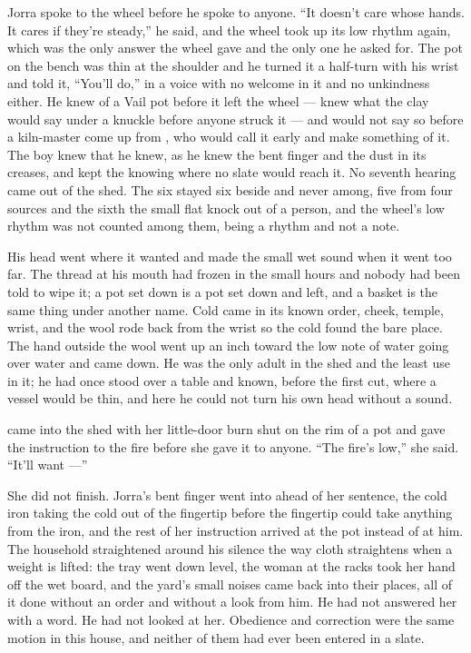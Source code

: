 Jorra spoke to the wheel before he spoke to anyone. “It doesn't care whose hands. It cares if they're steady,” he said, and the wheel took up its low rhythm again, which was the only answer the wheel gave and the only one he asked for. The pot on the bench was thin at the shoulder and he turned it a half-turn with his wrist and told it, “You'll do,” in a voice with no welcome in it and no unkindness either. He knew  of a Vail pot before it left the wheel --- knew what the clay would say under a knuckle before anyone struck it --- and would not say so before a kiln-master come up from , who would call it early and make something of it. The boy knew that he knew, as he knew the bent finger and the dust in its creases, and kept the knowing where no slate would reach it. No seventh hearing came out of the shed. The six stayed six beside and never among, five from four sources and the sixth the small flat knock out of a person, and the wheel's low rhythm was not counted among them, being a rhythm and not a note.

His head went where it wanted and made the small wet sound when it went too far. The thread at his mouth had frozen in the small hours and nobody had been told to wipe it; a pot set down is a pot set down and left, and a basket is the same thing under another name. Cold came in its known order, cheek, temple, wrist, and the wool rode back from the wrist so the cold found the bare place. The hand outside the wool went up an inch toward the low note of water going over water and came down. He was the only adult in the shed and the least use in it; he had once stood over a table and known, before the first cut, where a vessel would be thin, and here he could not turn his own head without a sound.

\scenebreak

 came into the shed with her little-door burn shut on the rim of a pot and gave the instruction to the fire before she gave it to anyone. “The fire's low,” she said. “It'll want ---”

She did not finish. Jorra's bent finger went into  ahead of her sentence, the cold iron taking the cold out of the fingertip before the fingertip could take anything from the iron, and the rest of her instruction arrived at the pot instead of at him. The household straightened around his silence the way cloth straightens when a weight is lifted: the tray went down level, the woman at the racks took her hand off the wet board, and the yard's small noises came back into their places, all of it done without an order and without a look from him. He had not answered her with a word. He had not looked at her. Obedience and correction were the same motion in this house, and neither of them had ever been entered in a slate.

